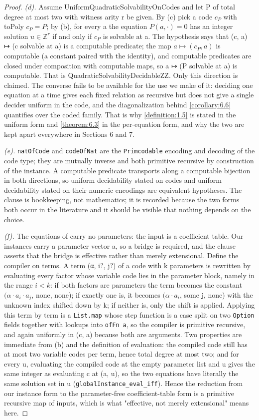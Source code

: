 \begin{proof}
\emph{(d).} Assume UniformQuadraticSolvabilityOnCodes and let P of total degree at most two with witness arity r be given. By (c) pick a code $c_{P}$ with toPoly $c_{P} = P$; by (b), for every a the equation $P(a, ·) = 0$ has an integer solution $u ∈ ℤ^{r}$ if and only if $c_{P}$ is solvable at a. The hypothesis says that (c, a) ↦ (c solvable at a) is a computable predicate; the map $a ↦ (c_{P}, a)$ is computable (a constant paired with the identity), and computable predicates are closed under composition with computable maps, so a ↦ (P solvable at a) is computable. That is QuadraticSolvabilityDecidableZZ. Only this direction is claimed. The converse fails to be available for the use we make of it: deciding one equation at a time gives each fixed relation as recursive but does not give a single decider uniform in the code, and the diagonalization behind \cref{corollary:6.6} quantifies over the coded family. That is why \cref{definition:1.5} is stated in the uniform form and \cref{theorem:6.3} in the per-equation form, and why the two are kept apart everywhere in Sections 6 and 7.

\emph{(e).} \texttt{natOfCode} and \texttt{codeOfNat} are the \texttt{Primcodable} encoding and decoding of the code type; they are mutually inverse and both primitive recursive by construction of the instance. A computable predicate transports along a computable bijection in both directions, so uniform decidability stated on codes and uniform decidability stated on their numeric encodings are equivalent hypotheses. The clause is bookkeeping, not mathematics; it is recorded because the two forms both occur in the literature and it should be visible that nothing depends on the choice.

\emph{(f).} The equations of \cite{GS04} carry no parameters: the input is a coefficient table. Our instances carry a parameter vector a, so a bridge is required, and the clause asserts that the bridge is effective rather than merely extensional. Define the compiler on terms. A term (α, i?, j?) of a code with k parameters is rewritten by evaluating every factor whose variable code lies in the parameter block, namely in the range $i < k$: if both factors are parameters the term becomes the constant $(α·a_{i}·a_{j}$, none, none); if exactly one is, it becomes $(α·a_{i}$, some j, none) with the unknown index shifted down by k; if neither is, only the shift is applied. Applying this term by term is a \texttt{List.\allowbreak{}map} whose step function is a case split on two \texttt{Option} fields together with lookups into \texttt{ofFn a}, so the compiler is primitive recursive, and again uniformly in (c, a) because both are arguments. Two properties are immediate from (b) and the definition of evaluation: the compiled code still has at most two variable codes per term, hence total degree at most two; and for every u, evaluating the compiled code at the empty parameter list and u gives the same integer as evaluating c at (a, u), so the two equations have literally the same solution set in u (\texttt{globalInstance\_\allowbreak{}eval\_\allowbreak{}iff}). Hence the reduction from our instance form to the parameter-free coefficient-table form is a primitive recursive map of inputs, which is what "effective, not merely extensional" means here.


\end{proof}
